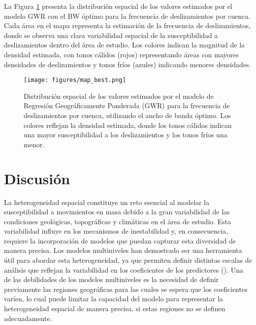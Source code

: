 \documentclass[
  manuscript=article,  
  layout=preprint,  
]{format}
\begin{document}
La Figura \ref{fig:map_best} presenta la distribución espacial de los valores estimados por el modelo GWR con el BW óptimo para la frecuencia de deslizamientos por cuenca. Cada área en el mapa representa la estimación de la frecuencia de deslizamientos, donde se observa una clara variabilidad espacial de la susceptibilidad a deslizamientos dentro del área de estudio. Los colores indican la magnitud de la densidad estimada, con tonos cálidos (rojos) representando áreas con mayores densidades de deslizamientos y tonos fríos (azules) indicando menores densidades.

\begin{figure}[ht!]
    \centering
      {\texttt{[image: figures/map\_best.png]}}
\caption{Distribución espacial de los valores estimados por el modelo de Regresión Geográficamente Ponderada (GWR) para la frecuencia de deslizamientos por cuenca, utilizando el ancho de banda óptimo. Los colores reflejan la densidad estimada, donde los tonos cálidos indican una mayor susceptibilidad a los deslizamientos y los tonos fríos una menor.}
    \label{fig:map_best}
\end{figure}

\section{Discusión}

La heterogeneidad espacial constituye un reto esencial al modelar la susceptibilidad a movimientos en masa debido a la gran variabilidad de las condiciones geológicas, topográficas y climáticas en el área de estudio. Esta variabilidad influye en los mecanismos de inestabilidad y, en consecuencia, requiere la incorporación de modelos que puedan capturar esta diversidad de manera precisa. Los modelos multiniveles han demostrado ser una herramienta útil para abordar esta heterogeneidad, ya que permiten definir distintas escalas de análisis que reflejan la variabilidad en los coeficientes de los predictores (\cite{lee1996hierarchical}). Una de las debilidades de los modelos multiniveles es la necesidad de definir previamente las regiones geográficas para las cuales se espera que los coeficientes varíen, lo cual puede limitar la capacidad del modelo para representar la heterogeneidad espacial de manera precisa, si estas regiones no se definen adecuadamente.
\end{document}
